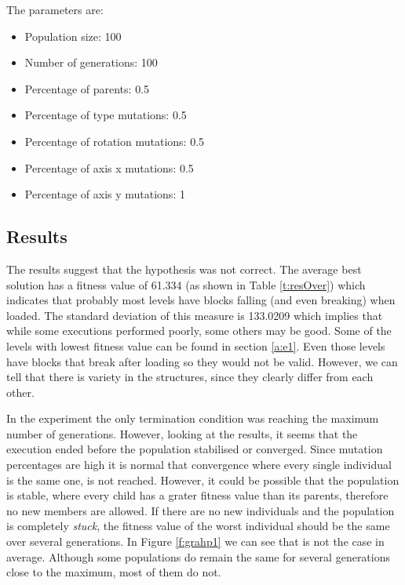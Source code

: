 The parameters are:
\begin{itemize}
	\item Population size: 100
	\item Number of generations: 100
	\item Percentage of parents: 0.5
	\item Percentage of type mutations: 0.5
	\item Percentage of rotation mutations: 0.5
	\item Percentage of axis x mutations: 0.5
	\item Percentage of axis y mutations: 1
\end{itemize}
\subsection{Results}
The results suggest that the hypothesis was not correct. The average best solution has a fitness value of 61.334 (as shown in Table \ref{t:resOver}) which indicates that probably most levels have blocks falling (and even breaking) when loaded. The standard deviation of this measure is 133.0209 which implies that while some executions performed poorly, some others may be good. Some of the levels with lowest fitness value can be found in section \ref{a:e1}. Even those levels have blocks that break after loading so they would not be valid. However, we can tell that there is variety in the structures, since they clearly differ from each other. 

In the experiment the only termination condition was reaching the maximum number of generations. However, looking at the results, it seems that the execution ended before the population stabilised or converged. Since mutation percentages are high it is normal that convergence where every single individual is the same one, is not reached. However, it could be possible that the population is stable, where every child has a grater fitness value than its parents, therefore no new members are allowed. If there are no new individuals and the population is completely \textit{stuck}, the fitness value of the worst individual should be the same over several generations. In Figure \ref{f:grahp1} we can see that is not the case in average. Although some populations do remain the same for several generations close to the maximum, most of them do not.

